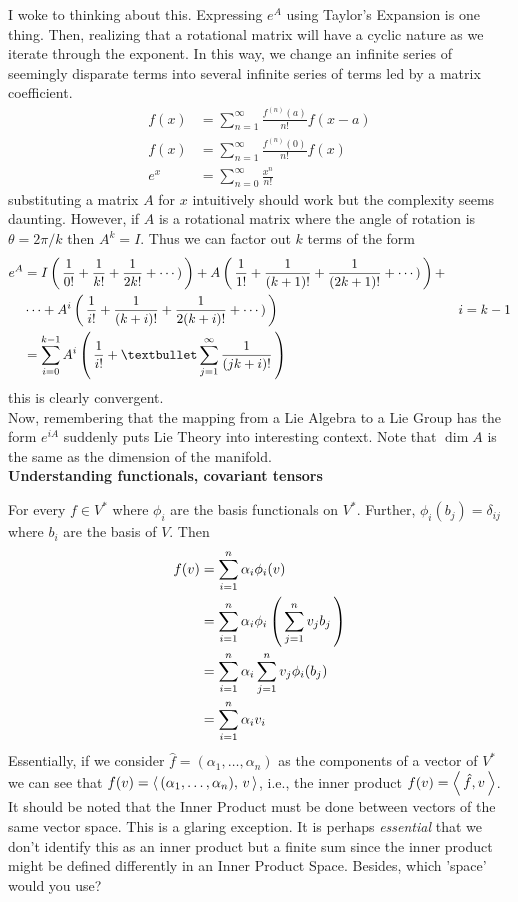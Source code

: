 \documentclass[12pt,a4paper]{report}
\begin{document}
I woke to thinking about this.  Expressing $e^A$ using Taylor's Expansion is one thing.  Then, realizing that a rotational matrix will have a cyclic nature as we iterate through the exponent.  In this way, we change an infinite series of seemingly disparate terms into several infinite series of terms led by a matrix coefficient.
\begin{align*}
	f(x) &= \sum_{n=1}^\infty \frac{f^{(n)}(a)}{n!} f(x-a) \\
	f(x) &= \sum_{n=1}^\infty \frac{f^{(n)}(0)}{n!} f(x) \\
	e^x &= \sum_{n=0}^\infty \frac{x^n}{n!}
\end{align*}substituting a matrix $A$ for $x$ intuitively should work but the complexity seems daunting.  However, if $A$ is a rotational matrix where the angle of rotation is $\theta=2\pi/k$ then $A^k = I$.  Thus we can factor out $k$ terms of the form
\begin{align*}
	e^A &= I\PAREN{\frac{1}{0!} + \frac{1}{k!}+\frac{1}{{2k}!}+\cdots)} + A\PAREN{\frac{1}{1!} + \frac{1}{(k+1)!}+\frac{1}{(2k+1)!}+\cdots)} + \\
	&\cdots + A^i\PAREN{\frac{1}{i!} + \frac{1}{(k+i)!}+\frac{1}{2(k+i)!}+\cdots)} & i=k-1 \\
	&= \sum_{i=0}^{k-1}A^i\PAREN{\frac{1}{i!}+{•}\sum_{j=1}^\infty\frac{1}{(jk+i)!} }
\end{align*}this is clearly convergent.\\

Now, remembering that the mapping from a Lie Algebra to a Lie Group has the form $e^{iA}$ suddenly puts Lie Theory into interesting context.  Note that $\dim A$ is the same as the dimension of the manifold.\\
\HLINE
\textbf{Understanding functionals, covariant tensors}

For every $f \in V^*$ where $\phi_i$ are the basis functionals on $V^*$.  Further, $\phi_i(b_j) = \delta_{ij}$ where $b_i$ are the basis of $V$. Then 
\begin{align*}
	f(v) &= \sum_{i=1}^n \alpha_i\phi_i(v)\\
	&= \sum_{i=1}^n \alpha_i \phi_i\left (\, \sum_{j=1}^n v_jb_j \,\right ) \\
	&= \sum_{i=1}^n \alpha_i  \sum_{j=1}^n v_j \phi_i(b_j)\\
	&= \sum_{i=1}^n \alpha_iv_i
\end{align*}Essentially, if we consider $\hat{f}=(\alpha_1,\dots,\alpha_n)$ as the components of a vector of $V^*$ we can see that $f(v) = \left \langle\, (\alpha_1,\dots,\alpha_n),\, v \,\right \rangle$, i.e., the inner product $f(v) = \left \langle\, \hat{f}, v \,\right \rangle$.  It should be noted that the Inner Product must be done between vectors of the same vector space.  This is a glaring exception.  It is perhaps \textit{essential} that we don't identify this as an inner product but a finite sum since the inner product might be defined differently in an Inner Product Space.  Besides, which 'space' would you use?\\
\end{document}
